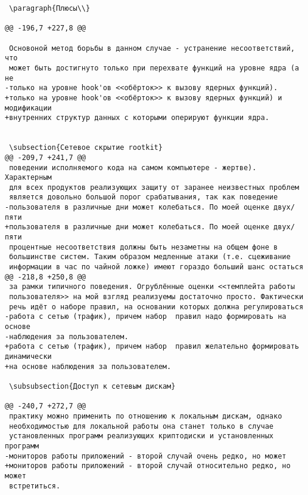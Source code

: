 \begin{verbatim}
 \paragraph{Плюсы\\}

@@ -196,7 +227,8 @@

 Основоной метод борьбы в данном случае - устранение несоответствий, что
 может быть достигнуто только при перехвате функций на уровне ядра (а не
-только на уровне hook'ов <<обёрток>> к вызову ядерных функций).
+только на уровне hook'ов <<обёрток>> к вызову ядерных функций) и модификации
+внутренних структур данных с которыми оперируют функции ядра.


 \subsection{Сетевое скрытие rootkit}
@@ -209,7 +241,7 @@
 поведении исполняемого кода на самом компьютере - жертве). Характерным
 для всех продуктов реализующих защиту от заранее неизвестных проблем
 является довольно большой порог срабатывания, так как поведение
-пользователя в различные дни может колебаться. По моей оценке двух/пяти
+пользователя в различные дни может колебаться. По моей оценке двух/пяти
 процентные несоответствия должны быть незаметны на общем фоне в
 большинстве систем. Таким образом медленные атаки (т.е. сцеживание
 информации в час по чайной ложке) имеют гораздо больший шанс остаться
@@ -218,8 +250,8 @@
 за рамки типичного поведения. Огрублённые оценки <<темплейта работы
 пользователя>> на мой взгляд реализуемы достаточно просто. Фактически
 речь идёт о наборе правил, на основании которых должна регулироваться
-работа с сетью (трафик), причем набор  правил надо формировать на основе
-наблюдения за пользователем.
+работа с сетью (трафик), причем набор  правил желательно формировать динамически
+на основе наблюдения за пользователем.

 \subsubsection{Доступ к сетевым дискам}

@@ -240,7 +272,7 @@
 практику можно применить по отношению к локальным дискам, однако
 необходимостью для локальной работы она станет только в случае
 установленных программ реализующих криптодиски и установленных программ
-мониторов работы приложений - второй случай очень редко, но может
+мониторов работы приложений - второй случай относительно редко, но может
 встретиться.



\end{verbatim}
